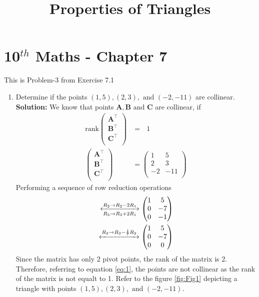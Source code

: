 \documentclass[12pt]{article}
\newcommand{\solution}{\noindent \textbf{Solution: }}
\newcommand{\myvec}[1]{\ensuremath{\begin{pmatrix}#1\end{pmatrix}}}
\let\vec\mathbf
\begin{document}
\begin{center}
\title{\textbf{Properties of Triangles}}
\date{\vspace{-5ex}} %
\maketitle
\end{center}
\setcounter{page}{1}

\section{10$^{th}$ Maths - Chapter 7}
This is Problem-3 from Exercise 7.1
\begin{enumerate}
\item Determine if the points $(1,5), (2,3), \text{ and } (-2,-11)$ are collinear.  \\
\solution 
 We know that points $\vec{A}, \vec{B} \text{ and } \vec{C}$ are collinear, if
\begin{align}
  \label{eq:1}
\text{rank}\myvec{ 
	\vec{A}^\top \\ 
	\vec{B}^\top \\ 
	\vec{C}^\top \\
}    &= \text{ } 1 \\   
	\myvec{ \vec{A}^\top \\ 
			\vec{B}^\top \\ 
			\vec{C}^\top \\
} &=   		\myvec{
        		1 & 5 \\
        		2 & 3 \\
        		-2 & -11 \\
}
\end{align}
Performing a sequence of row reduction operations \\
\begin{align}
\xleftrightarrow[{R_3\rightarrow R_3+2R_1}]{{R_2\rightarrow R_2-2R_1}}  \myvec{
  1 & 5 \\
  0 & -7 \\
  0 & -1 \\
}    \\
\xleftrightarrow[]{{R_3\rightarrow R_3-\frac{1}{7}R_2}}  \myvec{
  1 & 5 \\
  0 & -7 \\
  0 & 0 \\
}
\end{align}
Since the matrix has only 2 pivot points, the rank of the matrix is 2. Therefore, referring to equation \ref{eq:1}, the points are not collinear as the rank of the matrix is not equalt to 1. Refer to the figure \ref{fig:Fig1} depicting a triangle with points $(1,5), (2,3), \text{ and } (-2,-11)$. 

\end{enumerate}
\end{document}
